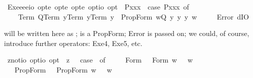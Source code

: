 \begin{isabellebody}
\begin{isamarkuptext}
\end{isamarkuptext}%
\isamarkuptrue%
\isamarkupfalse%
\ Exe{}{\isacharcolon}{\isacharcolon}{\isachardoublequoteopen}{\isacharparenleft}e{\isasymRightarrow}e{\isasymRightarrow}e{\isasymRightarrow}io{\isacharparenright}\ opt{\isasymRightarrow}e\ opt{\isasymRightarrow}e\ opt{\isasymRightarrow}e\ opt{\isasymRightarrow}io\ opt{\isachardoublequoteclose}\ \ {\isachardoublequoteopen}{\isacharless}P{\isasymbullet}x{}{\isacharcomma}x{}{\isacharcomma}x{}{\isachargreater}\ {\isasymequiv}\ case\ {\isacharparenleft}P{\isacharcomma}x{}{\isacharcomma}x{}{\isacharcomma}x{}{\isacharparenright}\ of\ \isanewline
\ \ \ \ {\isacharparenleft}Term\ Q{\isacharcomma}Term\ y{}{\isacharcomma}Term\ y{}{\isacharcomma}Term\ y{}{\isacharparenright}\ {\isasymRightarrow}\ PropForm\ {\isacharparenleft}{\isasymlambda}w{\isachardot}{\isacharparenleft}Q\ y{}\ y{}\ y{}{\isacharparenright}\ w{\isacharparenright}\isanewline
\ \ {\isacharbar}\ {\isacharunderscore}\ {\isasymRightarrow}\ Error\ dIO{\isachardoublequoteclose}%
\begin{isamarkuptext}%
  will be written here as ;  is a PropForm; Error is passed on; 
we could, of course, introduce further operators: Exe4, Exe5, etc.%
\end{isamarkuptext}%
\isamarkuptrue%
\isamarkupfalse%
\ z{\isacharunderscore}not{\isacharcolon}{\isacharcolon}{\isachardoublequoteopen}io\ opt{\isasymRightarrow}io\ opt{\isachardoublequoteclose}\ \ {\isachardoublequoteopen}{\isasymnot}\isactrlsup z\ {\isasymphi}\ {\isasymequiv}\ case\ {\isasymphi}\ of\ \isanewline
\ \ \ \ Form\ {\isasympsi}\ {\isasymRightarrow}\ Form\ {\isacharparenleft}{\isasymlambda}w{\isachardot}\ {\isasymnot}\ {\isasympsi}\ w{\isacharparenright}\isanewline
\ \ {\isacharbar}\ PropForm\ {\isasympsi}\ {\isasymRightarrow}\ PropForm\ {\isacharparenleft}{\isasymlambda}w{\isachardot}\ {\isasymnot}\ {\isasympsi}\ w{\isacharparenright}\isanewline

\end{isabellebody}
